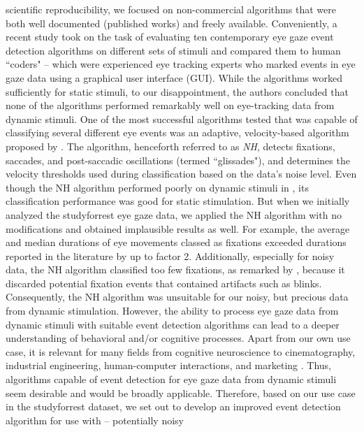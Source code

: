     scientific reproducibility, we focused on non-commercial algorithms that were both well documented (published
    works) and freely available. Conveniently, a recent study \citep{Andersson2017} took on the task of evaluating
    ten contemporary eye gaze event detection algorithms on  different sets of stimuli and compared them to human
    ``coders" -- which were experienced eye tracking experts who marked events in eye gaze data using a graphical
    user interface (GUI). While the algorithms worked sufficiently for static stimuli, to our disappointment, the
    authors concluded that none of the algorithms performed remarkably well on eye-tracking data from dynamic stimuli.
    One of the most successful algorithms tested that was capable of classifying several different eye
    events was an adaptive, velocity-based algorithm proposed by \citet{Nystrom2010AnData}.
    The algorithm, henceforth referred to as \textit{NH}, detects fixations, saccades, and post-saccadic
    oscillations (termed ``glissades"), and determines the velocity thresholds used during classification based on the
    data's noise level. Even though the NH algorithm performed poorly on dynamic stimuli in \citet{Andersson2017}, its
    classification performance was good for static stimulation. But when we initially analyzed the studyforrest eye gaze
    data, we applied the NH algorithm with no modifications and obtained implausible results as well. For example, the
    average and median durations of eye movements  classed as fixations exceeded durations  reported in the
    literature \citep{holmqvist2011eye,dorr2010variability} by up to factor 2. Additionally, especially for noisy
    data, the NH algorithm classified too few fixations, as  remarked by \citet{Friedman2018}, because it discarded
    potential fixation events that contained artifacts such as blinks. Consequently, the NH algorithm was
    unsuitable for our noisy, but precious data from dynamic stimulation.
    However, the ability to process eye gaze data from dynamic stimuli with suitable event detection algorithms can
    lead to a deeper understanding of behavioral and/or cognitive processes. Apart from our own use case, it is
    relevant for many fields from  cognitive neuroscience to cinematography, industrial engineering, human-computer
    interactions, and marketing \citep{Duchowski2002}. Thus, algorithms capable of event detection for eye gaze data
    from dynamic stimuli seem desirable and would be broadly applicable. Therefore, based on our use case in the
    studyforrest dataset, we set out to develop an improved event detection algorithm for use with -- potentially noisy
